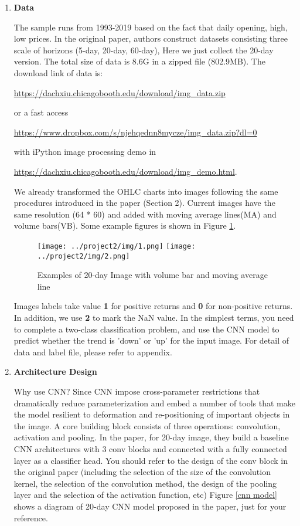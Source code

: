 \documentclass[11pt]{article}
\begin{document}
\begin{enumerate}
    \item \textbf{Data}
    
    The sample runs from 1993-2019 based on the fact that daily opening, high, low prices. In the original paper, authors construct datasets consisting three scale of horizons (5-day, 20-day, 60-day), Here we just collect the 20-day version. The total size of data is 8.6G in a zipped file (802.9MB). The download link of data is: 
    
    \url{https://dachxiu.chicagobooth.edu/download/img_data.zip}
    
    or a fast access 
    
    \url{https://www.dropbox.com/s/njehqednn8mycze/img_data.zip?dl=0}
    
    with iPython image processing demo in 
    
    \url{https://dachxiu.chicagobooth.edu/download/img_demo.html}. 

    We already transformed the OHLC charts into images following the same procedures introduced in the paper (Section 2). Current images have the same resolution (64 * 60) and added with moving average lines(MA) and volume bars(VB). Some example figures is shown in Figure \ref{20-day image}.
    
    \begin{figure}
        \centering
        \texttt{[image: ../project2/img/1.png]}
        \hspace{0.5in}
        \texttt{[image: ../project2/img/2.png]}
        \caption{Examples of 20-day Image with volume bar and moving average line}
        \label{20-day image}
    \end{figure}


    Images labels take value \textbf{1} for positive returns and \textbf{0} for non-positive returns. In addition, we use \textbf{2} to mark the NaN value. In the simplest terms, you need to complete a two-class classification problem, and use the CNN model to predict whether the trend is 'down' or 'up' for the input image. For detail of data and label file, please refer to appendix.
    
    \item \textbf{Architecture Design}
    
    Why use CNN? Since CNN impose cross-parameter restrictions that dramatically reduce parameterization and embed a number of tools that make the model resilient to deformation and re-positioning of important objects in the image. A core building block consists of three operations: convolution, activation and pooling. In the paper, for 20-day image, they build a baseline CNN architectures with 3 conv blocks and connected with a fully connected layer as a classifier head. You should refer to the design of the conv block in the original paper (including the selection of the size of the convolution kernel, the selection of the convolution method, the design of the pooling layer and the selection of the activation function, etc) Figure \ref{cnn model} shows a diagram of 20-day CNN model proposed in the paper, just for your reference.
    

\end{enumerate}
\end{document}

